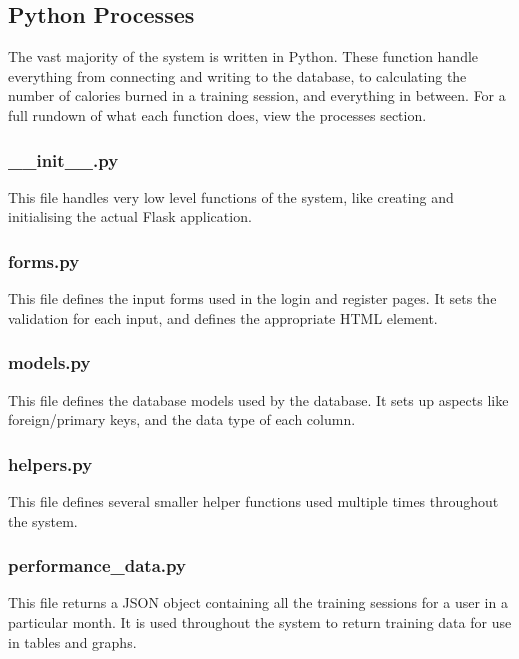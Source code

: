 \documentclass{article}[12pt,a4paper]
\begin{document}
\subsection{Python Processes}
The vast majority of the system is written in Python. These function handle everything from connecting and writing to the database, to calculating the number of calories burned in a training session, and everything in between. For a full rundown of what each function does, view the processes section.

\subsubsection{\_\_init\_\_.py}
This file handles very low level functions of the system, like creating and initialising the actual Flask application.


\subsubsection{forms.py}
This file defines the input forms used in the login and register pages. It sets the validation for each input, and defines the appropriate HTML element.


\subsubsection{models.py}
This file defines the database models used by the database. It sets up aspects like foreign/primary keys, and the data type of each column.


\subsubsection{helpers.py}
This file defines several smaller helper functions used multiple times throughout the system.


\subsubsection{performance\_data.py}
This file returns a JSON object containing all the training sessions for a user in a particular month. It is used throughout the system to return training data for use in tables and graphs.

\end{document}
